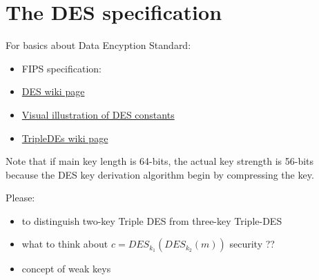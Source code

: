 \section{The DES specification}
\label{The_DES_specification}


For basics about Data Encyption Standard:
\begin{itemize}
	\item FIPS specification: 
	\item \href{http://en.wikipedia.org/wiki/Data_Encryption_Standard}{DES wiki page}
	\item \href{http://en.wikipedia.org/wiki/Non-Standard_positional_systems}{Visual illustration of DES constants}
	\item \href{http://en.wikipedia.org/wiki/Triple_DES}{TripleDEs wiki page}		
\end{itemize}

Note that if main key length is 64-bits, the actual key strength is 56-bits\\
because the DES key derivation algorithm begin by compressing the key.

\vspace{3mm}
Please:
\begin{itemize}
	\item to distinguish two-key Triple DES from three-key Triple-DES
	\item what to think about $c = DES_{k_1}(DES_{k_2}(m))$ security ??
	\item concept of weak keys
\end{itemize}

